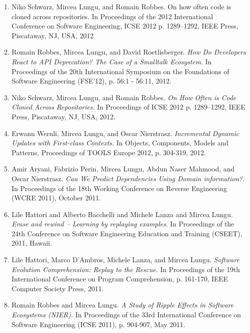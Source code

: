 \begin{enumerate}

\item Niko Schwarz, Mircea Lungu, and Romain Robbes. On how often code is cloned across repositories. In Proceedings of the 2012 International Conference on Software Engineering, ICSE 2012 p. 1289--1292, IEEE Press, Piscataway, NJ, USA, 2012


\item Romain Robbes, Mircea Lungu, and David Roetlisberger. \emph{How Do Developers React to API Deprecation? The Case of a Smalltalk Ecosystem.} In Proceedings of the 20th International Symposium on the Foundations of Software Engineering (FSE'12), p. 56:1 - 56:11, 2012.

\item Niko Schwarz, Mircea Lungu, and Romain Robbes. \emph{On How Often is Code Cloned Across Repositories.} In Proceedings of ICSE 2012 p. 1289--1292, IEEE Press, Piscataway, NJ, USA, 2012.

\item Erwann Wernli, Mircea Lungu, and Oscar Nierstrasz. \emph{Incremental Dynamic Updates with First-class Contexts.} In Objects, Components, Models and Patterns, Proceedings of TOOLS Europe 2012, p. 304-319, 2012.


\item Amir Aryani, Fabrizio Perin, Mircea Lungu, Abdun Naser Mahmood, and Oscar Nierstrasz. \emph{Can We Predict Dependencies Using Domain information?.} In Proceedings of the 18th Working Conference on Reverse Engineering (WCRE 2011), October 2011. 

\item Lile Hattori and Alberto Bacchelli and Michele Lanza and Mircea Lungu. \emph{Erase and rewind  --  Learning by replaying examples}. In Proceedings of the 24th Conference on Software Engineering Education and Training (CSEET), 2011, Hawaii. 

\item Lile Hattori, Marco D'Ambros, Michele Lanza, and Mircea Lungu. \emph{Software Evolution Comprehension: Replay to the Rescue.} In Proceedings of the 19th International Conference on Program Comprehension, p. 161-170, IEEE Computer Society Press, 2011. 
\item 
Romain Robbes and Mircea Lungu. \emph{A Study of Ripple Effects in Software Ecosystems (NIER).} In Proceedings of the 33rd International Conference on Software Engineering (ICSE 2011), p. 904-907, May 2011. 


\end{enumerate}
